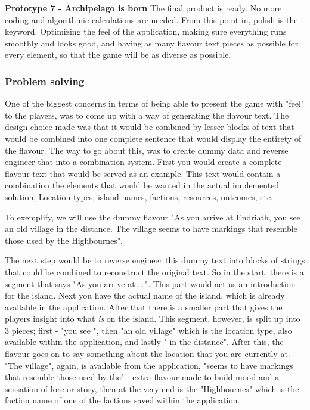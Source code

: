 \begin{center}
\textbf{Prototype 7 - Archipelago is born}
The final product is ready. No more coding and algorithmic calculations are needed. From this point in, polish is the keyword. Optimizing the feel of the application, making sure everything runs smoothly and looks good, and having as many flavour text pieces as possible for every element, so that the game will be as diverse as possible.
\end{center}

\subsubsection{Problem solving}
One of the biggest concerns in terms of being able to present the game with "feel" to the players, was to come up with a way of generating the flavour text. The design choice made was that it would be combined by lesser blocks of text that would be combined into one complete sentence that would display the entirety of the flavour. The way to go about this, was to create dummy data and reverse engineer that into a combination system. First you would create a complete flavour text that would be served as an example. This text would contain a combination the elements that would be wanted in the actual implemented solution; Location types, island names, factions, resources, outcomes, etc.

To exemplify, we will use the dummy flavour "As you arrive at Endriath, you see an old village in the distance. The village seems to have markings that resemble those used by the Highbournes".

The next step would be to reverse engineer this dummy text into blocks of strings that could be combined to reconstruct the original text. So in the start, there is a segment that says "As you arrive at ...". This part would act as an introduction for the island. Next you have the actual name of the island, which is already available in the application. After that there is a smaller part that gives the players insight into what \textit{is} on the island. This segment, however, is split up into 3 pieces; first - "you see ", then "an old village" which is the location type, also available within the application, and lastly " in the distance". After this, the flavour goes on to say something about the location that you are currently at. "The village", again, is available from the application, "seems to have markings that resemble those used by the" - extra flavour made to build mood and a sensation of lore or story, then at the very end is the "Highbournes" which is the faction name of one of the factions saved within the application.


